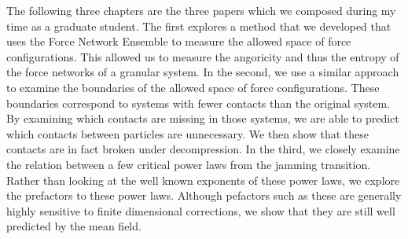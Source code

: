 The following three chapters are the three papers which we composed during my time as a graduate student. The first explores a method that we developed that uses the Force Network Ensemble to measure the allowed space of force configurations. This allowed us to measure the angoricity and thus the entropy of the force networks of a granular system. In the second, we use a similar approach to examine the boundaries of the allowed space of force configurations. These boundaries correspond to systems with fewer contacts than the original system. By examining which contacts are missing in those systems, we are able to predict which contacts between particles are unnecessary. We then show that these contacts are in fact broken under decompression. In the third, we closely examine the relation between a few critical power laws from the jamming transition. Rather than looking at the well known exponents of these power laws, we explore the prefactors to these power laws. Although pefactors such as these are generally highly sensitive to finite dimensional corrections, we show that they are still well predicted by the mean field.
